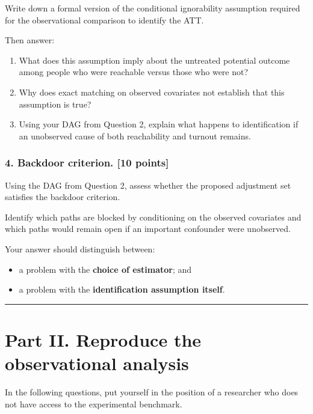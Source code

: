 \documentclass[
]{article}
\providecommand{\tightlist}{%
  \setlength{\itemsep}{0pt}\setlength{\parskip}{0pt}}
\begin{document}
Write down a formal version of the conditional ignorability assumption
required for the observational comparison to identify the ATT.

Then answer:

\begin{enumerate}
\def\labelenumi{\arabic{enumi}.}
\tightlist
\item
  What does this assumption imply about the untreated potential outcome
  among people who were reachable versus those who were not?
\item
  Why does exact matching on observed covariates not establish that this
  assumption is true?
\item
  Using your DAG from Question 2, explain what happens to identification
  if an unobserved cause of both reachability and turnout remains.
\end{enumerate}

\subsubsection{4. Backdoor criterion. {[}10
points{]}}\label{backdoor-criterion.-10-points}

Using the DAG from Question 2, assess whether the proposed adjustment
set satisfies the backdoor criterion.

Identify which paths are blocked by conditioning on the observed
covariates and which paths would remain open if an important confounder
were unobserved.

Your answer should distinguish between:

\begin{itemize}
\tightlist
\item
  a problem with the \textbf{choice of estimator}; and
\item
  a problem with the \textbf{identification assumption itself}.
\end{itemize}

\begin{center}\rule{0.5\linewidth}{0.5pt}\end{center}

\section{Part II. Reproduce the observational
analysis}\label{part-ii.-reproduce-the-observational-analysis}

In the following questions, put yourself in the position of a researcher
who does not have access to the experimental benchmark.
\end{document}
